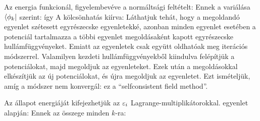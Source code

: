    Az energia funkcionál, figyelembevéve a normáltsági feltételt:
   Ennek a variálása $\langle\phi_k\rvert$ szerint:
   így
   A kölcsönhatás kiírva:
   Láthatjuk tehát, hogy a megoldandó egyenlet szétesett egyrészecske egyenletekké, azonban minden egyenlet esetében a potenciál tartalmazza a többi egyenlet megoldásaként kapott egyrészecske hullámfüggvényeket. Emiatt az egyenletek csak együtt oldhatóak meg iterációs módszerrel. Valamilyen kezdeti hullámfüggvényekből kiindulva felépítjük a potenciálokat, majd megoldjuk az egyenleteket. Ezek után a megoldásokkal elkészítjük az új potenciálokat, és újra megoldjuk az egyenletet. Ezt ismételjük, amíg a módszer nem konvergál: ez a ``selfconsistent field method''.
   
   Az állapot energiáját kifejezhetjük az $\varepsilon_i$ Lagrange-multiplikátorokkal.  egyenlet alapján:
   Ennek az összege minden $k$-ra:
   
